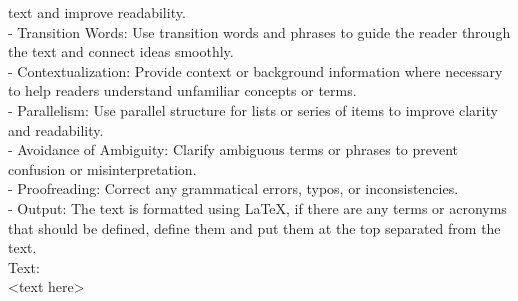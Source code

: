 text and improve readability. \\
- Transition Words: Use transition words and phrases to guide the reader through the text and connect ideas smoothly. \\
- Contextualization: Provide context or background information where necessary to help readers understand unfamiliar concepts or terms. \\
- Parallelism: Use parallel structure for lists or series of items to improve clarity and readability. \\
- Avoidance of Ambiguity: Clarify ambiguous terms or phrases to prevent confusion or misinterpretation. \\
- Proofreading: Correct any grammatical errors, typos, or inconsistencies. \\
- Output: The text is formatted using LaTeX, if there are any terms or acronyms that should be defined, define them and put them at the top separated from the text. \\
Text: \\
<text here>